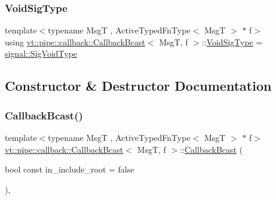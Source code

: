 \subsubsection{\texorpdfstring{Void\+Sig\+Type}{VoidSigType}}
{\footnotesize\ttfamily template$<$typename MsgT , Active\+Typed\+Fn\+Type$<$ Msg\+T $>$ $\ast$ f$>$ \\
using \hyperlink{structvt_1_1pipe_1_1callback_1_1_callback_bcast}{vt\+::pipe\+::callback\+::\+Callback\+Bcast}$<$ MsgT, f $>$\+::\hyperlink{structvt_1_1pipe_1_1callback_1_1_callback_bcast_a64032b57b71c27653b93b3e13bf38145}{Void\+Sig\+Type} =  \hyperlink{namespacevt_1_1pipe_1_1signal_acbe257d1ae44f20fa9fd9b6ed3057caf}{signal\+::\+Sig\+Void\+Type}}



\subsection{Constructor \& Destructor Documentation}
\mbox{\label{structvt_1_1pipe_1_1callback_1_1_callback_bcast_acfc9a64a9f4d26b1bac0d2ba5a6b3b58}} 
\subsubsection{\texorpdfstring{Callback\+Bcast()}{CallbackBcast()}\hspace{0.1cm}{\footnotesize\ttfamily [1/5]}}
{\footnotesize\ttfamily template$<$typename MsgT , Active\+Typed\+Fn\+Type$<$ Msg\+T $>$ $\ast$ f$>$ \\
\hyperlink{structvt_1_1pipe_1_1callback_1_1_callback_bcast}{vt\+::pipe\+::callback\+::\+Callback\+Bcast}$<$ MsgT, f $>$\+::\hyperlink{structvt_1_1pipe_1_1callback_1_1_callback_bcast}{Callback\+Bcast} (\begin{DoxyParamCaption}\item[{bool const}]{in\+\_\+include\+\_\+root = {\ttfamily false} }\end{DoxyParamCaption})\hspace{0.3cm}{\ttfamily [inline]}, {\ttfamily [explicit]}}

\mbox{\label{structvt_1_1pipe_1_1callback_1_1_callback_bcast_adbfcc31e986a2aed709b8517e0e978ae}} 

